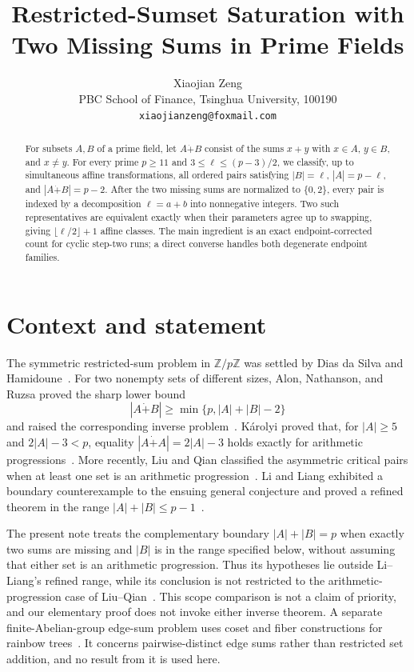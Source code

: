 \documentclass[11pt]{article}
\title{Restricted-Sumset Saturation with Two Missing Sums in Prime Fields}
\author{Xiaojian Zeng\\
  \small PBC School of Finance, Tsinghua University, 100190\\
  \small \texttt{xiaojianzeng@foxmail.com}}
\date{}
\newcommand{\rsum}{\mathbin{\dot{+}}}
\begin{document}
\maketitle

\begin{abstract}
For subsets $A,B$ of a prime field, let $A\rsum B$ consist of the sums
$x+y$ with $x\in A$, $y\in B$, and $x\ne y$.  For every prime $p\geq
11$ and $3\leq \ell\leq (p-3)/2$, we classify, up to simultaneous
affine transformations, all ordered pairs satisfying
$|B|=\ell$, $|A|=p-\ell$, and $|A\rsum B|=p-2$.  After the two missing
sums are normalized to $\{0,2\}$, every pair is indexed by a decomposition
$\ell=a+b$ into nonnegative integers.  Two such representatives are
equivalent exactly when their parameters agree up to swapping, giving
$\lfloor\ell/2\rfloor+1$ affine classes.  The main ingredient is an exact
endpoint-corrected count for cyclic step-two runs; a direct converse handles
both degenerate endpoint families.
\end{abstract}

\section{Context and statement}

The symmetric restricted-sum problem in $\mathbb Z/p\mathbb Z$ was settled
by Dias da Silva and Hamidoune~\cite{DiasDaSilvaHamidoune1994}.  For two
nonempty sets of different sizes, Alon, Nathanson, and Ruzsa proved the sharp lower
bound
\[
 |A\rsum B|\geq \min\{p,|A|+|B|-2\}
\]
and raised the corresponding inverse problem~\cite{AlonNathansonRuzsa1996}.
K\'arolyi proved that, for $|A|\geq5$ and $2|A|-3<p$, equality
$|A\rsum A|=2|A|-3$ holds exactly for arithmetic
progressions~\cite{Karolyi2005}.  More recently, Liu
and Qian classified the asymmetric critical pairs when at least one set is
an arithmetic progression~\cite{LiuQian2026}.  Li and Liang exhibited a
boundary counterexample to the ensuing general conjecture and proved a
refined theorem in the range $|A|+|B|\leq p-1$~\cite{LiLiang2026}.

The present note treats the complementary boundary $|A|+|B|=p$ when
exactly two sums are missing and $|B|$ is in the range specified below,
without assuming that either set is an arithmetic progression.  Thus its
hypotheses lie outside Li--Liang's refined range, while its conclusion is not
restricted to the arithmetic-progression case of
Liu--Qian~\cite{LiuQian2026,LiLiang2026}.  This scope comparison is not a claim of
priority, and our elementary proof does not invoke either inverse theorem.
A separate finite-Abelian-group edge-sum problem uses coset and fiber
constructions for rainbow trees~\cite{Zeng2026Rainbow}.  It concerns
pairwise-distinct edge sums rather than restricted set addition, and no result
from it is used here.
\end{document}
